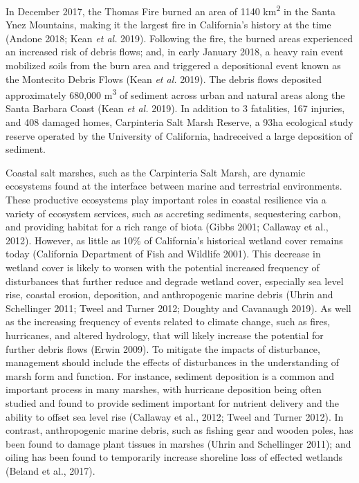 \documentclass[
]{article}
\begin{document}
In December 2017, the Thomas Fire burned an area of 1140
km\textsuperscript{2} in the Santa Ynez Mountains, making it the largest
fire in California's history at the time (Andone 2018; Kean \emph{et
al.} 2019). Following the fire, the burned areas experienced an
increased risk of debris flows; and, in early January 2018, a heavy rain
event mobilized soils from the burn area and triggered a depositional
event known as the Montecito Debris Flows (Kean \emph{et al.} 2019). The
debris flows deposited approximately 680,000 m\textsuperscript{3} of
sediment across urban and natural areas along the Santa Barbara Coast
(Kean \emph{et al.} 2019). In addition to 3 fatalities, 167 injuries,
and 408 damaged homes, Carpinteria Salt Marsh Reserve, a 93ha ecological
study reserve operated by the University of California, hadreceived a
large deposition of sediment.

Coastal salt marshes, such as the Carpinteria Salt Marsh, are dynamic
ecosystems found at the interface between marine and terrestrial
environments. These productive ecosystems play important roles in
coastal resilience via a variety of ecosystem services, such as
accreting sediments, sequestering carbon, and providing habitat for a
rich range of biota (Gibbs 2001; Callaway et al., 2012). However, as
little as 10\% of California's historical wetland cover remains today
(California Department of Fish and Wildlife 2001). This decrease in
wetland cover is likely to worsen with the potential increased frequency
of disturbances that further reduce and degrade wetland cover,
especially sea level rise, coastal erosion, deposition, and
anthropogenic marine debris (Uhrin and Schellinger 2011; Tweel and
Turner 2012; Doughty and Cavanaugh 2019). As well as the increasing
frequency of events related to climate change, such as fires,
hurricanes, and altered hydrology, that will likely increase the
potential for further debris flows (Erwin 2009). To mitigate the impacts
of disturbance, management should include the effects of disturbances in
the understanding of marsh form and function. For instance, sediment
deposition is a common and important process in many marshes, with
hurricane deposition being often studied and found to provide sediment
important for nutrient delivery and the ability to offset sea level rise
(Callaway et al., 2012; Tweel and Turner 2012). In contrast,
anthropogenic marine debris, such as fishing gear and wooden poles, has
been found to damage plant tissues in marshes (Uhrin and Schellinger
2011); and oiling has been found to temporarily increase shoreline loss
of effected wetlands (Beland et al., 2017).
\end{document}
